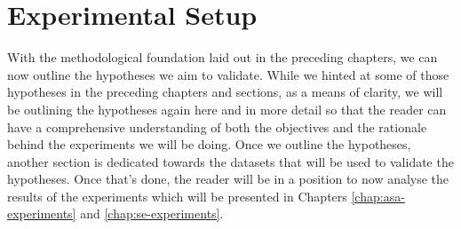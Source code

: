 \documentclass[logo,bsc,singlespacing,parskip,online]{infthesis}
\begin{document}
\chapter{Experimental Setup}
\label{chap:experimental_setup}
With the methodological foundation laid out in the preceding chapters, we can now outline the hypotheses we aim to validate.
While we hinted at some of those hypotheses in the preceding chapters and sections, as a means of clarity, 
we will be outlining the hypotheses again here and in more detail so that the reader can have a comprehensive understanding of 
both the objectives and the rationale behind the experiments we will be doing.
Once we outline the hypotheses, another section is dedicated towards the datasets that will be used to validate the hypotheses.
Once that's done, the reader will be in a position to now analyse the results of the experiments which will be presented in Chapters \ref{chap:asa-experiments} and \ref{chap:se-experiments}.
\end{document}
